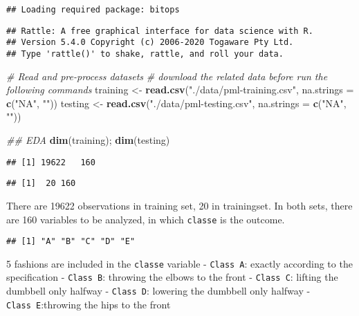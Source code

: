 \documentclass[
]{article}
\newenvironment{Shaded}{\begin{snugshade}}{\end{snugshade}}
\newcommand{\CommentTok}[1]{\textcolor[rgb]{0.56,0.35,0.01}{\textit{#1}}}
\newcommand{\DataTypeTok}[1]{\textcolor[rgb]{0.13,0.29,0.53}{#1}}
\newcommand{\KeywordTok}[1]{\textcolor[rgb]{0.13,0.29,0.53}{\textbf{#1}}}
\newcommand{\NormalTok}[1]{#1}
\newcommand{\OperatorTok}[1]{\textcolor[rgb]{0.81,0.36,0.00}{\textbf{#1}}}
\newcommand{\StringTok}[1]{\textcolor[rgb]{0.31,0.60,0.02}{#1}}
\begin{document}
\begin{verbatim}
## Loading required package: bitops
\end{verbatim}

\begin{verbatim}
## Rattle: A free graphical interface for data science with R.
## Version 5.4.0 Copyright (c) 2006-2020 Togaware Pty Ltd.
## Type 'rattle()' to shake, rattle, and roll your data.
\end{verbatim}

\begin{Shaded}
\begin{Highlighting}[]
\CommentTok{# Read and pre-process datasets}
\CommentTok{# download the related data before run the following commands}
\NormalTok{training <-}\StringTok{ }\KeywordTok{read.csv}\NormalTok{(}\StringTok{"./data/pml-training.csv"}\NormalTok{, }\DataTypeTok{na.strings =} \KeywordTok{c}\NormalTok{(}\StringTok{"NA"}\NormalTok{, }\StringTok{""}\NormalTok{))}
\NormalTok{testing <-}\StringTok{ }\KeywordTok{read.csv}\NormalTok{(}\StringTok{"./data/pml-testing.csv"}\NormalTok{, }\DataTypeTok{na.strings =} \KeywordTok{c}\NormalTok{(}\StringTok{"NA"}\NormalTok{, }\StringTok{""}\NormalTok{))}

\CommentTok{## EDA}
\KeywordTok{dim}\NormalTok{(training); }\KeywordTok{dim}\NormalTok{(testing)}
\end{Highlighting}
\end{Shaded}

\begin{verbatim}
## [1] 19622   160
\end{verbatim}

\begin{verbatim}
## [1]  20 160
\end{verbatim}

There are 19622 observations in training set, 20 in trainingset. In both
sets, there are 160 variables to be analyzed, in which \texttt{classe}
is the outcome.

\begin{Shaded}
\end{Shaded}

\begin{verbatim}
## [1] "A" "B" "C" "D" "E"
\end{verbatim}

5 fashions are included in the \texttt{classe} variable -
\texttt{Class\ A}: exactly according to the specification -
\texttt{Class\ B}: throwing the elbows to the front - \texttt{Class\ C}:
lifting the dumbbell only halfway - \texttt{Class\ D}: lowering the
dumbbell only halfway - \texttt{Class\ E}:throwing the hips to the front
\end{document}
